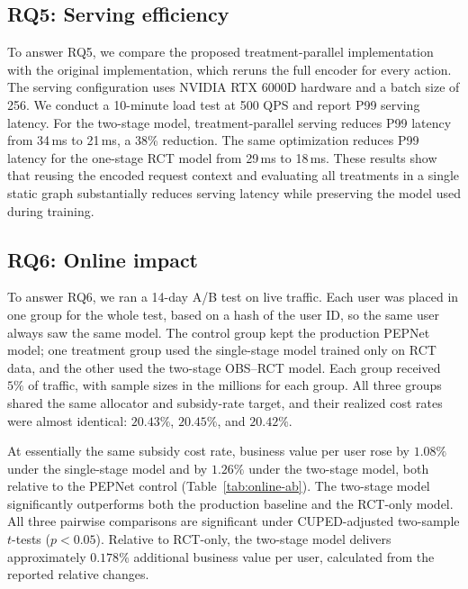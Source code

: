 \documentclass[sigconf,nonacm]{acmart}
\begin{document}
\subsection{RQ5: Serving efficiency}

To answer RQ5, we compare the proposed treatment-parallel implementation with
the original implementation, which reruns the full encoder for every action.
The serving configuration uses NVIDIA RTX 6000D hardware and a batch size of 256. We conduct a 10-minute load test at 500 QPS and report P99 serving latency.
For the two-stage model, treatment-parallel serving reduces P99 latency from
34\,ms to 21\,ms, a 38\% reduction. The same optimization reduces P99
latency for the one-stage RCT model from 29\,ms to 18\,ms. These results show
that reusing the encoded request context and evaluating all treatments in a
single static graph substantially reduces serving latency while preserving
the model used during training.

\subsection{RQ6: Online impact}
\label{sec:online-ab}

To answer RQ6, we ran a 14-day A/B test on live traffic. Each user was
placed in one group for the whole test, based on a hash of the user ID, so
the same user always saw the same model. The control group kept the
production PEPNet model; one treatment group used the single-stage model
trained only on RCT data, and the other used the two-stage OBS--RCT model.
Each group received $5\%$ of traffic, with sample sizes in the millions
for each group. All three groups shared the same
allocator and subsidy-rate target, and their realized cost rates were almost
identical: $20.43\%$, $20.45\%$, and $20.42\%$.

At essentially the same subsidy cost rate, business value per user rose by $1.08\%$ under the
single-stage model and by $1.26\%$ under the two-stage model, both relative
to the PEPNet control (Table~\ref{tab:online-ab}). The two-stage model
significantly outperforms both the production baseline and the RCT-only model.
All three pairwise comparisons are significant under CUPED-adjusted two-sample
$t$-tests ($p<0.05$). Relative to RCT-only, the two-stage model delivers
approximately $0.178\%$ additional business value per user, calculated from
the reported relative changes.
\end{document}

